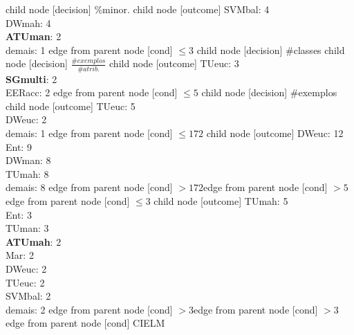 child {node [decision] {\%minor.}
child {node [outcome] {SVMbal: 4\\
DWmah: 4\\
\textbf{ATUman}: 2\\
demais: 1} edge from parent node [cond] {$\leq3$}}
child {node [decision] {\#classes}
child {node [decision] {$\frac{\#exemplos}{\#atrib.}$}
child {node [outcome] {TUeuc: 3\\
\textbf{SGmulti}: 2\\
EERacc: 2} edge from parent node [cond] {$\leq5$}}
child {node [decision] {\#exemplos}
child {node [outcome] {TUeuc: 5\\
DWeuc: 2\\
demais: 1} edge from parent node [cond] {$\leq172$}}
child {node [outcome] {DWeuc: 12\\
Ent: 9\\
DWman: 8\\
TUmah: 8\\
demais: 8} edge from parent node [cond] {$>172$}}edge from parent node [cond] {$>5$}}edge from parent node [cond] {$\leq3$}}
child {node [outcome] {TUmah: 5\\
Ent: 3\\
TUman: 3\\
\textbf{ATUmah}: 2\\
Mar: 2\\
DWeuc: 2\\
TUeuc: 2\\
SVMbal: 2\\
demais: 2} edge from parent node [cond] {$>3$}}edge from parent node [cond] {$>3$}}edge from parent node [cond] {CIELM}}
